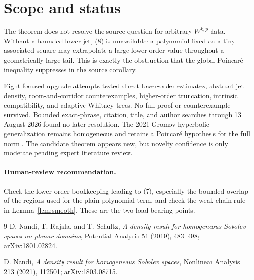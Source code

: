 \documentclass[11pt]{article}
\begin{document}
\section{Scope and status}

The theorem does not resolve the source question for arbitrary $W^{k,p}$
data.  Without a bounded lower jet, (8) is unavailable: a polynomial fixed on
a tiny associated square may extrapolate a large lower-order value throughout
a geometrically large tail.  This is exactly the obstruction that the global
Poincar\'e inequality suppresses in the source corollary.

Eight focused upgrade attempts tested direct lower-order estimates, abstract
jet density, room-and-corridor counterexamples, higher-order truncation,
intrinsic compatibility, and adaptive Whitney trees.  No full proof or
counterexample survived.  Bounded exact-phrase, citation, title, and author
searches through 13 August 2026 found no later resolution.  The 2021
Gromov-hyperbolic generalization remains homogeneous and retains a Poincar\'e
hypothesis for the full norm \cite{Nandi}.  The candidate theorem appears new,
but novelty confidence is only moderate pending expert literature review.

\paragraph{Human-review recommendation.}
Check the lower-order bookkeeping leading to (7), especially the bounded
overlap of the regions used for the plain-polynomial term, and check the weak
chain rule in Lemma~\ref{lem:smooth}.  These are the two load-bearing points.

\begin{thebibliography}{9}
D. Nandi, T. Rajala, and T. Schultz,
\emph{A density result for homogeneous Sobolev spaces on planar domains},
Potential Analysis 51 (2019), 483--498; arXiv:1801.02824.

D. Nandi,
\emph{A density result for homogeneous Sobolev spaces},
Nonlinear Analysis 213 (2021), 112501; arXiv:1803.08715.
\end{thebibliography}
\end{document}
